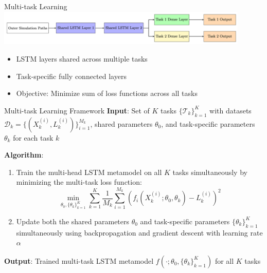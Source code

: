     \begin{frame}{Multi-task Learning}
    \includegraphics[width=0.9\textwidth]{../project3/figures/mtl.png}
    
    \begin{itemize}
        \item LSTM layers shared across multiple tasks
        \item Task-specific fully connected layers
        \item Objective: Minimize sum of loss functions across all tasks
    \end{itemize}
    \end{frame}
    
    \begin{frame}{Multi-task Learning Framework}
    \textbf{Input}: Set of $K$ tasks $\{\mathcal{T}_k\}_{k=1}^K$ with datasets $\mathcal{D}_k = \{(X_k^{(i)}, L_k^{(i)})\}_{i=1}^{M_k}$, shared parameters $\theta_0$, and task-specific parameters $\theta_k$ for each task $k$
      
    \textbf{Algorithm}:
    \begin{enumerate}
        \item Train the multi-head LSTM metamodel on all $K$ tasks simultaneously by minimizing the multi-task loss function:
        \begin{equation}
            \min_{\theta_0, \{\theta_k\}_{k=1}^K} \sum_{k=1}^K \frac{1}{M_k} \sum_{i=1}^{M_k} \left( f_i(X_k^{(i)}; \theta_0, \theta_k) - L_k^{(i)} \right)^2
        \end{equation}
        \item Update both the shared parameters $\theta_0$ and task-specific parameters $\{\theta_k\}_{k=1}^K$ simultaneously using backpropagation and gradient descent with learning rate $\alpha$
    \end{enumerate}
    
    \textbf{Output}: Trained multi-task LSTM metamodel $f(\cdot; \theta_0, \{\theta_k\}_{k=1}^K)$ for all $K$ tasks
    \end{frame}
    
